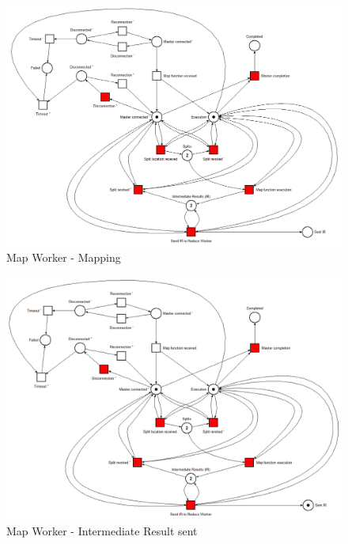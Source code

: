 \begin{figure}[!ht]
    \centering
    \includegraphics[width=\linewidth]{document/chapters/chapter_6/images/map_worker_petri_net_5.png}
    \caption{Map Worker - Mapping}
    \label{fig:map_worker_petri_net_5}
\end{figure}

\begin{figure}[!ht]
    \centering
    \includegraphics[width=\linewidth]{document/chapters/chapter_6/images/map_worker_petri_net_6.png}
    \caption{Map Worker - Intermediate Result sent}
    \label{fig:map_worker_petri_net_6}
\end{figure}

